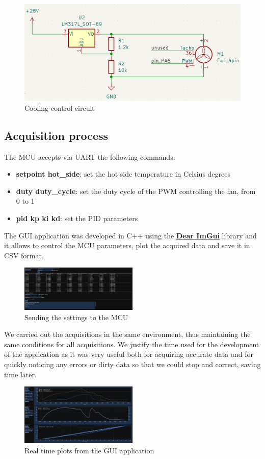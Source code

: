 \begin{figure}[h]
  \centering
  \includegraphics[scale=0.25]{assets/cooling_control.png}
  \caption{Cooling control circuit}
\end{figure}

\subsection{Acquisition process}

The MCU accepts via UART the following commands:
\begin{itemize}
  \item \textbf{setpoint hot\_side}: set the hot side temperature in Celsius degrees
  \item \textbf{duty duty\_cycle}: set the duty cycle of the PWM controlling the fan, from 0 to 1
  \item \textbf{pid kp ki kd}: set the PID parameters
\end{itemize}

The GUI application was developed in C++ using the \href{https://github.com/ocornut/imgui}{\textbf{Dear ImGui}} library and it allows to control the MCU parameters, plot the acquired data and save it in CSV format.

\begin{figure}[h]
  \centering
  \includegraphics[width=0.5\textwidth]{assets/app_csv_commands.png}
  \caption{Sending the settings to the MCU}
\end{figure}

We carried out the acquisitions in the same environment, thus maintaining the same conditions for all acquisitions. We justify the time used for the development of the application as it was very useful both for acquiring accurate data and for quickly noticing any errors or dirty data so that we could stop and correct, saving time later.

\begin{figure}[h]
  \centering
  \includegraphics[width=0.5\textwidth]{assets/app_plots.png}
  \caption{Real time plots from the GUI application}
\end{figure}


